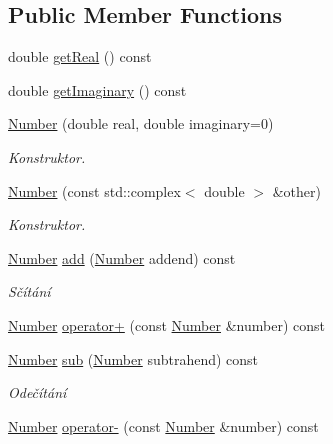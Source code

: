 \subsection*{Public Member Functions}
\begin{DoxyCompactItemize}
\item 
double \hyperlink{classteam22_1_1_math_1_1_number_adacbe355e9278da6a218598706c7f77c}{get\+Real} () const
\item 
double \hyperlink{classteam22_1_1_math_1_1_number_a033e1df614efe28459cabef254ca0a25}{get\+Imaginary} () const
\item 
\hyperlink{classteam22_1_1_math_1_1_number_a62b054aca95b93f5f36afb938223d54c}{Number} (double real, double imaginary=0)
\begin{DoxyCompactList}\small\item\em Konstruktor. \end{DoxyCompactList}\item 
\hyperlink{classteam22_1_1_math_1_1_number_a68e43ad66c5152bf7f39277bba1c0f1c}{Number} (const std\+::complex$<$ double $>$ \&other)
\begin{DoxyCompactList}\small\item\em Konstruktor. \end{DoxyCompactList}\item 
\hyperlink{classteam22_1_1_math_1_1_number}{Number} \hyperlink{classteam22_1_1_math_1_1_number_ae60b13b53c984dce975d1519e199ef8a}{add} (\hyperlink{classteam22_1_1_math_1_1_number}{Number} addend) const
\begin{DoxyCompactList}\small\item\em Sčítání \end{DoxyCompactList}\item 
\hyperlink{classteam22_1_1_math_1_1_number}{Number} \hyperlink{classteam22_1_1_math_1_1_number_abb2fc73931fb5e27e026cfedc79fdc31}{operator+} (const \hyperlink{classteam22_1_1_math_1_1_number}{Number} \&number) const
\item 
\hyperlink{classteam22_1_1_math_1_1_number}{Number} \hyperlink{classteam22_1_1_math_1_1_number_a60e8afb7de97804ac0b65bf1db37d0b4}{sub} (\hyperlink{classteam22_1_1_math_1_1_number}{Number} subtrahend) const
\begin{DoxyCompactList}\small\item\em Odečítání \end{DoxyCompactList}\item 
\hyperlink{classteam22_1_1_math_1_1_number}{Number} \hyperlink{classteam22_1_1_math_1_1_number_a5268ed342eae099e45a30541bb34e734}{operator-\/} (const \hyperlink{classteam22_1_1_math_1_1_number}{Number} \&number) const

\end{DoxyCompactItemize}
